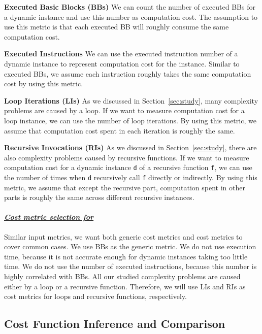 \noindent\textbf{Executed Basic Blocks (BBs)}
We can count the number of executed BBs for a dynamic instance
and use this number as computation cost. 
The assumption to use this metric is that 
each executed BB will roughly consume the same computation cost. 

\noindent\textbf{Executed Instructions}
We can use the executed instruction number of a dynamic 
instance to represent computation cost for the instance. 
Similar to executed BBs, we assume each instruction 
roughly takes the same computation cost by using this metric. 


\noindent\textbf{{Loop Iterations (LIs)}}
As we discussed in Section~\ref{sec:study},
many complexity problems are caused by a loop.
If we want to measure computation cost for a loop instance,
we can use the number of loop iterations.
By using this metric, we assume that computation 
cost spent in each iteration is roughly the same. 

\noindent\textbf{Recursive Invocations (RIs)}
As we discussed in Section~\ref{sec:study},
there are also complexity problems caused by recursive functions.
If we want to measure computation cost for a dynamic instance \texttt{d}
of a recursive function \texttt{f}, 
we can use the number of times when
\texttt{d} recursively call \texttt{f} directly or indirectly. 
By using this metric, 
we assume that except the recursive part, 
computation spent in other parts is roughly 
the same across different recursive instances. 

\paragraph{\textit{\underline{Cost metric selection for \Tool}}}
Similar input metrics,
we want both generic cost metrics and cost metrics to cover common cases. 
We use BBs as the generic metric.
We do not use execution time, 
because it is not accurate enough for dynamic instances taking too little time.
We do not use the number of executed instructions, 
because this number is highly correlated with BBs.  
All our studied complexity problems are caused either by a loop or a recursive function. 
Therefore, we will use LIs and RIs as cost metrics for loops and recursive functions, 
respectively.

\subsection{Cost Function Inference and Comparison}

